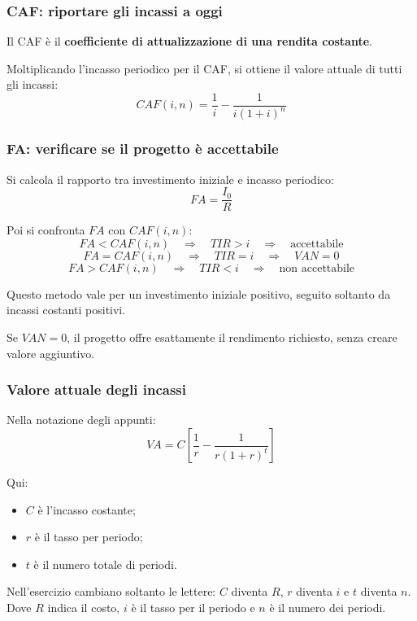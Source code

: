 \subsubsection*{CAF: riportare gli incassi a oggi}

\noindent
Il CAF è il \textbf{coefficiente di attualizzazione
di una rendita costante}.

\noindent
Moltiplicando l'incasso periodico per il CAF,
si ottiene il valore attuale di tutti gli incassi:
\[
    CAF(i,n)
    =
    \frac{1}{i}
    -
    \frac{1}{i(1+i)^n}
\]

\subsubsection*{FA: verificare se il progetto è accettabile}

\noindent
Si calcola il rapporto tra investimento iniziale
e incasso periodico:
\[
    FA=\frac{I_0}{R}
\]

\noindent
Poi si confronta $FA$ con $CAF(i,n)$:
\[
    FA<CAF(i,n)
    \quad\Rightarrow\quad
    TIR>i
    \quad\Rightarrow\quad
    \text{accettabile}
\]
\[
    FA=CAF(i,n)
    \quad\Rightarrow\quad
    TIR=i
    \quad\Rightarrow\quad
    VAN=0
\]
\[
    FA>CAF(i,n)
    \quad\Rightarrow\quad
    TIR<i
    \quad\Rightarrow\quad
    \text{non accettabile}
\]

\noindent
Questo metodo vale per un investimento iniziale positivo,
seguito soltanto da incassi costanti positivi.

\noindent
Se $VAN=0$, il progetto offre esattamente
il rendimento richiesto, senza creare valore aggiuntivo.

\subsubsection*{Valore attuale degli incassi}

\noindent
Nella notazione degli appunti:
\[
    VA
    =
    C\left[
        \frac{1}{r}
        -
        \frac{1}{r(1+r)^t}
    \right]
\]

\noindent
Qui:
\begin{itemize}
    \item $C$ è l'incasso costante;
    \item $r$ è il tasso per periodo;
    \item $t$ è il numero totale di periodi.
\end{itemize}

\noindent
Nell'esercizio cambiano soltanto le lettere:
$C$ diventa $R$, $r$ diventa $i$ e $t$ diventa $n$. Dove $R$ indica il costo,
$i$ è il tasso per il periodo e $n$ è il numero dei periodi. 

